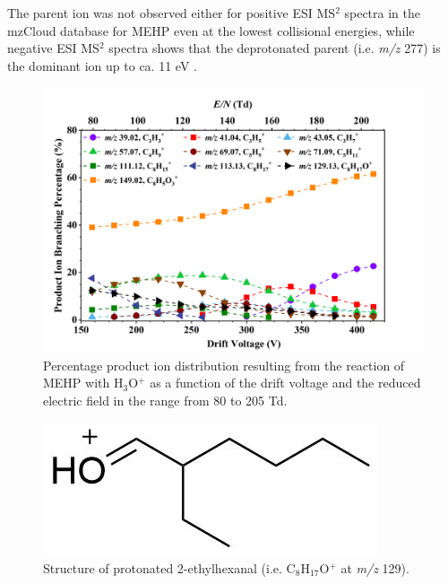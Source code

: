 The parent ion was not observed either for positive ESI MS$^2$ spectra in the mzCloud database for MEHP even at the lowest collisional energies, while negative ESI MS$^2$ spectra shows that the deprotonated parent (i.e. \textit{m/z} 277) is the dominant ion up to ca. 11 eV \cite{mzcloudMEHP}.









\begin{figure}[htb]%
\centering
\includegraphics[height=0.4\textheight]{pics/MEHP-BR.png}
\caption{Percentage product ion distribution resulting from the reaction of MEHP with H$_3$O$^+$ as a function of the drift voltage and the reduced electric field in the range from 80 to 205 Td.}
\label{fig:PH_MEHP_fs}
\end{figure}


\begin{figure}[htb]%
\centering
\includegraphics[height=0.05\textheight]{pics/PH/MEHP_frag.png}
\caption{Structure of protonated 2-ethylhexanal (i.e. C$_8$H$_{17}$O$^+$ at \textit{m/z} 129).}
\label{fig:PH_MEHP_frag}
\end{figure}


